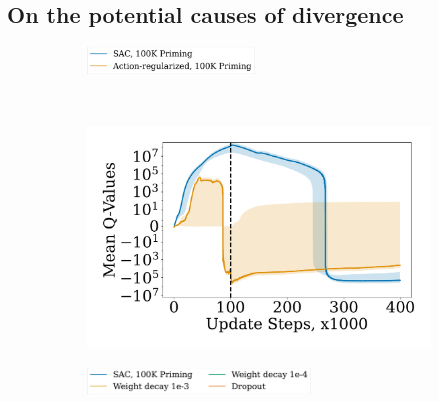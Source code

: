 \subsection{On the potential causes of divergence} \label{sec:causes}

\begin{figure}[b]
\begin{minipage}[b]{.31\textwidth}
\centering
    \begin{subfigure}[b]{\textwidth}
        \centering
        \includegraphics[height=0.7cm]{figures/dissecting/priming/priming_causes_return_legend.pdf}
    \end{subfigure}\\%
    \begin{subfigure}[b]{\textwidth}
        \centering
        \includegraphics[width=\textwidth]{figures/dissecting/priming/priming_causes_Q.pdf}
    \end{subfigure}%
    \caption{Priming with SAC and action regularization during priming. The latter lowers divergence. }
    \label{fig:overestimation:priming_bc}
\end{minipage}
\hfill
\begin{minipage}[b]{.62\textwidth}
    \centering
    \begin{subfigure}[b]{0.8\textwidth}
        \centering
        \includegraphics[height=0.7cm]{figures/dissecting/priming/priming_ablations_return_legend.pdf}
    \end{subfigure}\\%

\end{minipage}
\end{figure}
